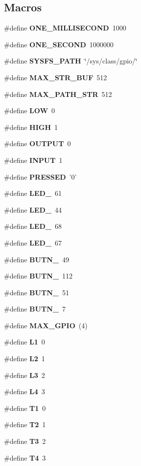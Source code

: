 \subsection*{Macros}
\begin{DoxyCompactItemize}
\item 
\#define {\bf O\-N\-E\-\_\-\-M\-I\-L\-L\-I\-S\-E\-C\-O\-N\-D}~1000
\item 
\#define {\bf O\-N\-E\-\_\-\-S\-E\-C\-O\-N\-D}~1000000
\item 
\#define {\bf S\-Y\-S\-F\-S\-\_\-\-P\-A\-T\-H}~\char`\"{}/sys/class/gpio/\char`\"{}
\item 
\#define {\bf M\-A\-X\-\_\-\-S\-T\-R\-\_\-\-B\-U\-F}~512
\item 
\#define {\bf M\-A\-X\-\_\-\-P\-A\-T\-H\-\_\-\-S\-T\-R}~512
\item 
\#define {\bf L\-O\-W}~0
\item 
\#define {\bf H\-I\-G\-H}~1
\item 
\#define {\bf O\-U\-T\-P\-U\-T}~0
\item 
\#define {\bf I\-N\-P\-U\-T}~1
\item 
\#define {\bf P\-R\-E\-S\-S\-E\-D}~'0'
\item 
\#define {\bf L\-E\-D\-\_}~61
\item 
\#define {\bf L\-E\-D\-\_}~44
\item 
\#define {\bf L\-E\-D\-\_}~68
\item 
\#define {\bf L\-E\-D\-\_}~67
\item 
\#define {\bf B\-U\-T\-N\-\_}~49
\item 
\#define {\bf B\-U\-T\-N\-\_}~112
\item 
\#define {\bf B\-U\-T\-N\-\_}~51
\item 
\#define {\bf B\-U\-T\-N\-\_}~7
\item 
\#define {\bf M\-A\-X\-\_\-\-G\-P\-I\-O}~(4)
\item 
\#define {\bf L1}~0
\item 
\#define {\bf L2}~1
\item 
\#define {\bf L3}~2
\item 
\#define {\bf L4}~3
\item 
\#define {\bf T1}~0
\item 
\#define {\bf T2}~1
\item 
\#define {\bf T3}~2
\item 
\#define {\bf T4}~3
\end{DoxyCompactItemize}
